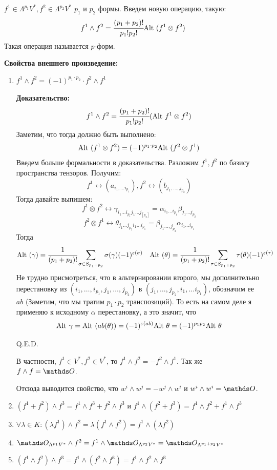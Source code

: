  $f^1 \in \Lambda^{p_1}V^*,f^2\in \Lambda^{p_2}V^*$ $p_1$ и $p_2$ формы. Введем новую операцию, такую:
$$f^1 \wedge f^2 = \cfrac{(p_1+p_2)!}{p_1!p_2!}\text{Alt } (f^1\otimes f^2)$$
Такая операция называется  $p$-форм.

\textbf{Свойства внешнего произведение:}

\begin{enumerate}
    \item $f^1\wedge f^2 = (-1)^{p_1 \cdot p_2} \cdot  f^2 \wedge f^1$
    
    \textbf{Доказательство:}
    $$f^1 \wedge f^2 = \cfrac{(p_1 + p_2)!}{p_1!p_2!} (\text{Alt } f^1 \otimes f^2)$$
    Заметим, что тогда должно быть выполнено:
    $$\text{Alt } (f^1 \otimes f^2)  = (-1)^{p_1\cdot p_2} \text{Alt }(f^2\otimes f^1)$$
    Введем больше формальности в доказательства. Разложим $f^1,f^2$ по базису пространства тензоров. Получим:
    $$f^1 \leftrightarrow (a_{i_1,\ldots i_{p_1}}), f^2 \leftrightarrow (b_{j_1,\ldots, j_{p_2} }) $$
    Тогда давайте выпишем:
    $$f^1 \otimes f^2 \leftrightarrow \gamma_{i_1\ldots i_{p_1}j_1\ldots j_[p_2]} = \alpha_{i_1\ldots i_{p_1} } \beta_{j_1\ldots j_{p_2}}$$
    $$f^2\otimes f^1 \leftrightarrow \theta_{j_1\ldots j_{p_2} i_1\ldots i_{p_1}}  = \beta_{j_1\ldots, j_{p_2}}\alpha_{i_1\ldots i_{p_1}}$$
    Тогда
    $$\text{Alt } (\gamma) = \cfrac{1}{(p_1 + p_2)!} \sum\limits_{\sigma \in S_{p_1+p_2}} \sigma(\gamma)(-1)^{\varepsilon(\sigma)} \quad \text{Alt }(\theta) = \cfrac{1}{(p_1+p_2)!} \sum_{\tau \in S_{p_1+p_2}}\tau(\theta)(-1)^{\varepsilon(\tau)}$$
    Не трудно присмотреться, что в альтернировании второго, мы дополнительно  
     перестановку  из $(i_1,\ldots,i_{p_1},j_1,\ldots, j_{p_2})$ в $(j_1,\ldots, j_{p_2},i_{1},\ldots i_{p_1})$, обозначим ее $ab$ (Заметим, что мы тратим  $p_1\cdot p_2$ транспозиций). То есть на самом деле я применяю к исходному $\alpha$ перестановку, а это значит, что 
    $$\text{Alt } \gamma = \text{Alt }(ab(\theta))=(-1)^{\varepsilon(ab)}\text{Alt } \theta=(-1)^{p_1p_2}\text{Alt } \theta$$

    \hfill Q.E.D.

    В частности, $f^1\in V^*,f^2\in V^*$, то $f^1 \wedge f^2 = -f^2 \wedge f^1$. Так же $f \wedge f = \zero$. 

    Отсюда выводится свойство, что $w^i \wedge w^j = - w^j \wedge w^i$ и $w^i \wedge w^i = \zero$. 

    \item $(f^1+f^2)\wedge f^3 = f^1\wedge f^3 + f^2 \wedge f^3$ и $f^1 \wedge (f^2 + f^3) = f^1 \wedge f^2 + f^1 \wedge f^3$
    \item $\forall \lambda \in K: (\lambda f^1)\wedge f^2 = \lambda(f^1 \wedge f^2) = f^1 \wedge (\lambda f^2)$
    \item $\zero_{\Lambda^{p_1}V^*} \wedge f^2 = f^1 \wedge \zero_{\Lambda^{p_2}V^*}=\zero_{\Lambda^{p_1+p_2}V^*}$
    \item $(f^1 \wedge f^2 ) \wedge f^3 = f^1 \wedge (f^2 \wedge f^3) = f^1 \wedge f^2 \wedge f^3$


\end{enumerate}
